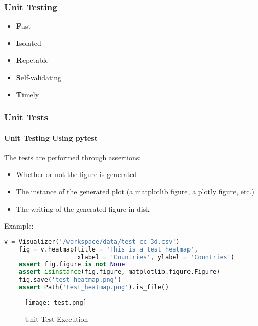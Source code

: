 \begin{frame}
  \frametitle{Unit Testing}

  \begin{itemize}
    \item \textbf{F}ast
    \item \textbf{I}solated
    \item \textbf{R}epetable 
    \item \textbf{S}elf-validating
    \item \textbf{T}imely
\end{itemize}

\end{frame}



\begin{frame}[fragile,shrink=30]
  \frametitle{Unit Tests}
  \framesubtitle{Unit Testing Using pytest}
  

  The tests are performed through assertions:
  \begin{itemize}
    \item Whether or not the figure is generated
    \item The instance of the generated plot (a matplotlib figure, a plotly figure, etc.) 
    \item The writing of the generated figure in disk
  \end{itemize}

  \vspace{5mm}

  Example:
  \begin{lstlisting}[language=Python]
    v = Visualizer('/workspace/data/test_cc_3d.csv')
    fig = v.heatmap(title = 'This is a test heatmap',
                    xlabel = 'Countries', ylabel = 'Countries')
    assert fig.figure is not None
    assert isinstance(fig.figure, matplotlib.figure.Figure)
    fig.save('test_heatmap.png')
    assert Path('test_heatmap.png').is_file()
  \end{lstlisting}

  \begin{figure}[h]
    \centering
    \texttt{[image: test.png]}
    \caption{Unit Test Execution}
    \label{fig:tests}
  \end{figure}
  

\end{frame}
